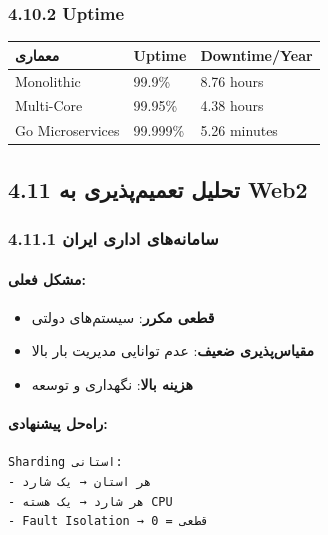 \documentclass[
]{article}
\newcounter{none} %
\providecommand{\tightlist}{%
  \setlength{\itemsep}{0pt}\setlength{\parskip}{0pt}}
\begin{document}
\subsubsection{4.10.2 Uptime}\label{uptime}

{\def\LTcaptype{none} %
\begin{longtable}[]{@{}lll@{}}
\toprule\noalign{}
معماری & Uptime & Downtime/Year \\
\midrule\noalign{}
\endhead
\bottomrule\noalign{}
\endlastfoot
Monolithic & 99.9\% & 8.76 hours \\
Multi-Core & 99.95\% & 4.38 hours \\
Go Microservices & 99.999\% & 5.26 minutes \\
\end{longtable}
}

\subsection{4.11 تحلیل تعمیم‌پذیری به
Web2}\label{ux62aux62dux644ux6ccux644-ux62aux639ux645ux6ccux645ux67eux630ux6ccux631ux6cc-ux628ux647-web2}

\subsubsection{4.11.1 سامانه‌های اداری
ایران}\label{ux633ux627ux645ux627ux646ux647ux647ux627ux6cc-ux627ux62fux627ux631ux6cc-ux627ux6ccux631ux627ux646}

\paragraph{مشکل فعلی:}\label{ux645ux634ux6a9ux644-ux641ux639ux644ux6cc}

\begin{itemize}
\tightlist
\item
  \textbf{قطعی مکرر}: سیستم‌های دولتی
\item
  \textbf{مقیاس‌پذیری ضعیف}: عدم توانایی مدیریت بار بالا
\item
  \textbf{هزینه بالا}: نگهداری و توسعه
\end{itemize}

\paragraph{راه‌حل
پیشنهادی:}\label{ux631ux627ux647ux62dux644-ux67eux6ccux634ux646ux647ux627ux62fux6cc}

\begin{verbatim}
Sharding استانی:
- هر استان → یک شارد
- هر شارد → یک هسته CPU
- Fault Isolation → قطعی = 0
\end{verbatim}
\end{document}
